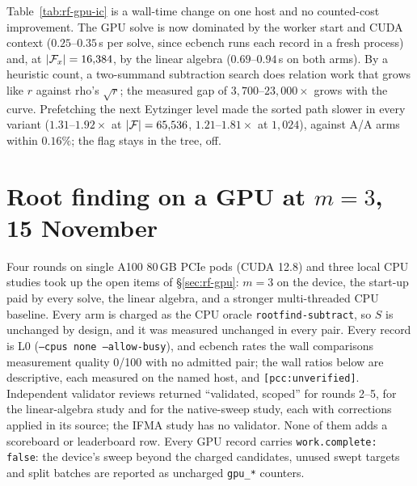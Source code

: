 \noindent Table~\ref{tab:rf-gpu-ic} is a wall-time change on one host and
no counted-cost improvement. The GPU solve is now dominated by the worker
start and CUDA context ($0.25$--$0.35$\,s per solve, since ecbench runs each
record in a fresh process) and, at $\lvert \mathcal{F}_x \rvert=16{,}384$, by the linear
algebra ($0.69$--$0.94$\,s on both arms). By a heuristic count, a two-summand
subtraction search does relation work that grows like $r$ against rho's
$\sqrt r$; the measured gap of $3{,}700$--$23{,}000\times$ grows with the
curve. Prefetching the next
Eytzinger level made the sorted path slower in every variant
($1.31$--$1.92\times$ at $\lvert \mathcal{F} \rvert=65{,}536$, $1.21$--$1.81\times$ at $1{,}024$),
against A/A arms within $0.16\%$; the flag stays in the tree, off.

\section{Root finding on a GPU at $m=3$, 15 November}\label{sec:rf-gpu15}

Four rounds on single A100 80\,GB PCIe pods (CUDA 12.8) and three local
CPU studies took up the open items of \S\ref{sec:rf-gpu}: $m=3$ on the
device, the start-up paid by every solve, the linear algebra, and a
stronger multi-threaded CPU baseline. Every arm is charged as the CPU
oracle \texttt{rootfind-subtract}, so $S$ is unchanged by design, and it
was measured unchanged in every pair. Every record is L0
(\texttt{--cpus none --allow-busy}), and ecbench rates the wall
comparisons measurement quality 0/100 with no admitted pair; the wall
ratios below are descriptive, each measured on the named host, and
\texttt{[pcc:unverified]}. Independent validator reviews returned
``validated, scoped'' for rounds 2--5, for the linear-algebra study and for
the native-sweep study, each with corrections applied in its source; the
IFMA study has no validator. None of them adds a scoreboard or
leaderboard row. Every GPU record carries \texttt{work.complete: false}:
the device's sweep beyond the charged candidates, unused swept targets
and split batches are reported as uncharged \texttt{gpu\_*} counters.

